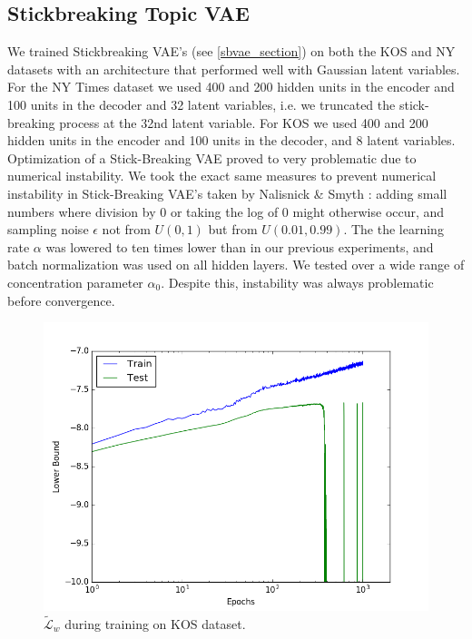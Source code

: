 \documentclass{report}
\begin{document}
		


		
		
		
	\subsection{Stickbreaking Topic VAE}\label{sbvae_exp}
	
	We trained Stickbreaking VAE's (see \ref{sbvae_section}) on both the KOS and NY datasets with an architecture that performed well with Gaussian latent variables. For the NY Times dataset we used 400 and  200 hidden units in the encoder and 100 units in the decoder and 32 latent variables, i.e. we truncated the stick-breaking process at the 32nd latent variable. For KOS we used 400 and 200 hidden units in the encoder and 100 units in the decoder, and 8 latent variables. Optimization of a Stick-Breaking VAE proved to very problematic due to numerical instability. We took the exact same measures to prevent numerical instability in Stick-Breaking VAE's taken by Nalisnick \& Smyth \cite{nalisnick2016deep}: adding small numbers where division by 0 or taking the log of 0 might otherwise occur, and sampling noise $\epsilon$ not from $U(0,1)$ but from $U(0.01, 0.99)$. The the learning rate $\alpha$ was lowered to ten times lower than in our previous experiments, and batch normalization was used on all hidden layers. We tested over a wide range of concentration parameter $\alpha_0$. Despite this, instability was always problematic before convergence. 
	\begin{figure}
		\includegraphics[scale = 0.45]{img/lb_kos_sbvae.png}
		\caption{$\tilde{\mathcal{L}}_w$ during training on KOS dataset.}
		\label{lb_kos_sbvae}
	\end{figure}
\end{document}
